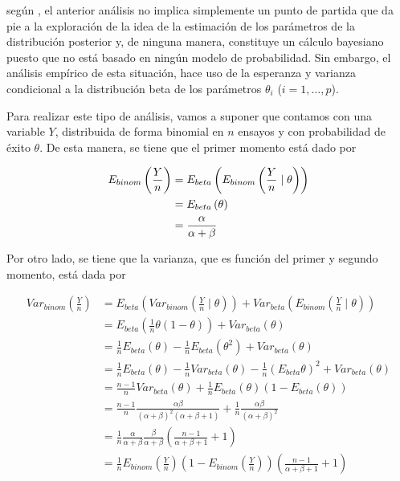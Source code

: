 \documentclass[10pt,openright]{book}\usepackage[]{graphicx}\usepackage[]{color}
\begin{document}
seg\'un , el anterior an\'alisis no implica simplemente un punto de partida que da pie a la exploraci\'on de la idea de la estimaci\'on de los par\'ametros de la distribuci\'on posterior y, de ninguna manera, constituye un c\'alculo bayesiano puesto que no est\'a basado en ning\'un modelo de probabilidad. Sin embargo, el an\'alisis emp\'irico de esta situaci\'on, hace uso de la  esperanza y varianza condicional a la distribuci\'on beta de los par\'ametros $\theta_i$ ($i=1,\ldots, p$).

Para realizar este tipo de an\'alisis, vamos a suponer que contamos con una variable $Y$, distribuida de forma binomial en $n$ ensayos y con probabilidad de \'exito $\theta$. De esta manera, se tiene que el primer momento est\'a dado por

\begin{align}\label{ecua7}
E_{binom}\left(\frac{Y}{n}\right)&=E_{beta}\left(E_{binom}\left(\frac{Y}{n} \mid \theta\right)\right) \notag \\
&=E_{beta}\left(\theta\right) \notag \\
&=\frac{\alpha}{\alpha+\beta}
\end{align}

Por otro lado, se tiene que la varianza, que es funci\'on del primer y segundo momento, est\'a dada por

\begin{align*}
Var_{binom}\left(\frac{Y}{n}\right)
&=E_{beta}\left(Var_{binom}\left(\frac{Y}{n} \mid \theta\right)\right)
+ Var_{beta}\left(E_{binom}\left(\frac{Y}{n} \mid \theta\right)\right)  \\
&=E_{beta}\left( \frac{1}{n}\theta(1-\theta)\right)
+ Var_{beta}\left(\theta\right)  \\
&=\frac{1}{n}E_{beta}(\theta) - \frac{1}{n}E_{beta}(\theta^2)+ Var_{beta}\left(\theta\right)  \\
&=\frac{1}{n}E_{beta}(\theta) - \frac{1}{n}Var_{beta}(\theta)- \frac{1}{n}(E_{beta}\theta)^2+ Var_{beta}\left(\theta\right)  \\
&=\frac{n-1}{n}Var_{beta}(\theta) + \frac{1}{n}E_{beta}(\theta)(1-E_{beta}(\theta))  \\
&=\frac{n-1}{n}\frac{\alpha\beta}{(\alpha+\beta)^2(\alpha+\beta+1)} +
\frac{1}{n}\frac{\alpha\beta}{(\alpha+\beta)^2}   \\
&=\frac{1}{n}\frac{\alpha}{\alpha+\beta}\frac{\beta}{\alpha+\beta}
\left(\frac{n-1}{\alpha+\beta+1}+1\right)   \\
&=\frac{1}{n}E_{binom}\left(\frac{Y}{n}\right)\left(1-E_{binom}\left(\frac{Y}{n}\right)\right)
\left(\frac{n-1}{\alpha+\beta+1}+1\right)
\end{align*}
\end{document}
